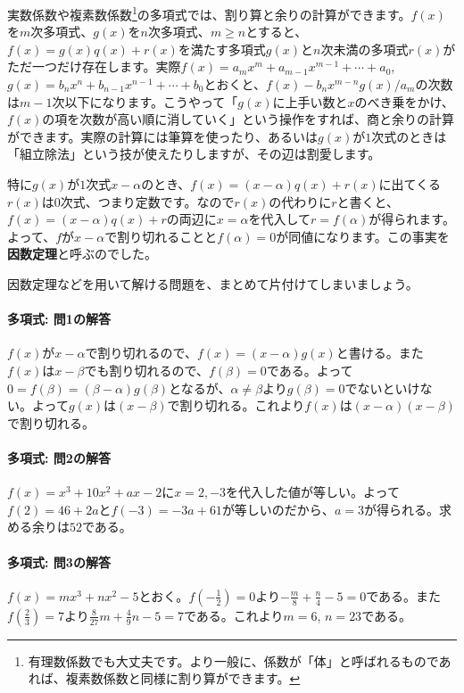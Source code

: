 実数係数や複素数係数\footnote{有理数係数でも大丈夫です。より一般に、係数が「体」と呼ばれるものであれば、複素数係数と同様に割り算ができます。}の多項式では、割り算と余りの計算ができます。$f(x)$を$m$次多項式、$g(x)$を$n$次多項式、$m\geq n$とすると、$f(x)=g(x)q(x)+r(x)$を満たす多項式$g(x)$と$n$次未満の多項式$r(x)$がただ一つだけ存在します。実際$f(x) = a_m x^m + a_{m-1}x^{m-1} + \cdots + a_0$, $g(x) = b_n x^n + b_{n-1} x^{n-1} +\cdots + b_0$とおくと、$f(x) - b_n x^{m-n} g(x) / a_m$の次数は$m-1$次以下になります。こうやって「$g(x)$に上手い数と$x$のべき乗をかけ、$f(x)$の項を次数が高い順に消していく」という操作をすれば、商と余りの計算ができます。実際の計算には筆算を使ったり、あるいは$g(x)$が$1$次式のときは「組立除法」という技が使えたりしますが、その辺は割愛します。

特に$g(x)$が$1$次式$x-\alpha$のとき、$f(x)=(x-\alpha)q(x)+r(x)$に出てくる$r(x)$は$0$次式、つまり定数です。なので$r(x)$の代わりに$r$と書くと、$f(x)=(x-\alpha)q(x)+r$の両辺に$x=\alpha$を代入して$r=f(\alpha)$が得られます。よって、$f$が$x-\alpha$で割り切れることと$f(\alpha)=0$が同値になります。この事実を\textbf{因数定理}と呼ぶのでした。

因数定理などを用いて解ける問題を、まとめて片付けてしまいましょう。


\paragraph{多項式: 問1の解答}
$f(x)$が$x-\alpha$で割り切れるので、$f(x)=(x-\alpha)g(x)$と書ける。また$f(x)$は$x-\beta$でも割り切れるので、$f(\beta)=0$である。よって$0=f(\beta)=(\beta-\alpha)g(\beta)$となるが、$\alpha\neq\beta$より$g(\beta)=0$でないといけない。よって$g(x)$は$(x-\beta)$で割り切れる。これより$f(x)$は$(x-\alpha)(x-\beta)$で割り切れる。

\paragraph{多項式: 問2の解答}
$f(x)=x^3+10x^2+ax-2$に$x=2,-3$を代入した値が等しい。よって$f(2)=46+2a$と$f(-3)=-3a+61$が等しいのだから、$a=3$が得られる。求める余りは$52$である。

\paragraph{多項式: 問3の解答}
$f(x)=mx^3+nx^2-5$とおく。$f(-\frac{1}{2})=0$より$-\frac{m}{8}+\frac{n}{4}-5=0$である。また$f(\frac{2}{3})=7$より$\frac{8}{27}m+\frac{4}{9}n-5=7$である。これより$m=6$, $n=23$である。

